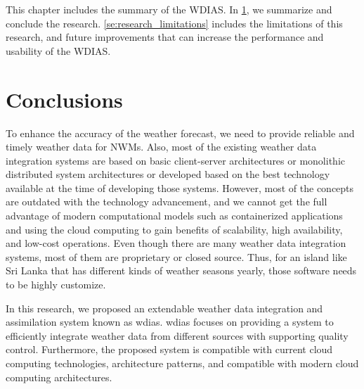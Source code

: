 This chapter includes the summary of the WDIAS. In \cref{se:summary_conclusion}, we summarize and conclude the research. \cref{se:research_limitations} includes the limitations of this research, and future improvements that can increase the performance and usability of the WDIAS.

\section{Conclusions}
\label{se:summary_conclusion}

To enhance the accuracy of the weather forecast, we need to provide reliable and timely weather data for NWMs. Also, most of the existing weather data integration systems are based on basic client-server architectures or monolithic distributed system architectures or developed based on the best technology available at the time of developing those systems. However, most of the concepts are outdated with the technology advancement, and we cannot get the full advantage of modern computational models such as containerized applications and using the cloud computing to gain benefits of scalability, high availability, and low-cost operations. Even though there are many weather data integration systems, most of them are proprietary or closed source. Thus, for an island like Sri Lanka that has different kinds of weather seasons yearly, those software needs to be highly customize.

In this research, we proposed an extendable weather data integration and assimilation system known as \acrfull{wdias}. \acrshort{wdias} focuses on providing a system to efficiently integrate weather data from different sources with supporting quality control. Furthermore, the proposed system is compatible with current cloud computing technologies, architecture patterns, and compatible with modern cloud computing architectures.

